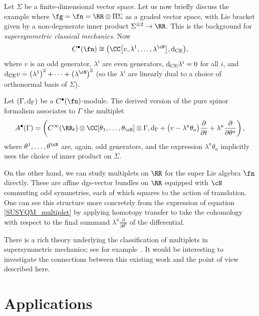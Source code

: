 \documentclass[10pt,a4paper]{amsart}
\numberwithin{equation}{section}
\def\d{{\rm d}}
\begin{document}
\begin{eg}
	Let $\Sigma$ be a finite-dimensional vector space. Let us now briefly discuss the example where $\fg = \fn = \RR \oplus \Pi \Sigma$ as a graded vector space, with Lie bracket given by a non-degenerate inner product $\Sigma^{\otimes 2} \to \RR$. This is the background for \emph{supersymmetric classical mechanics}. Now
	\begin{equation*}
	C^\bullet(\fn) \cong \big(\CC\big[v, \lambda^1, \ldots, \lambda^\cN\big] , \d_{\mathrm{CE}}\big),
	\end{equation*}
	where $v$ is an odd generator, $\lambda^i$ are even generators, $\d_{\mathrm{CE}} \lambda^i = 0$ for all $i$, and $\d_{\mathrm{CE}} v = \big(\lambda^1\big)^2 + \cdots + \big(\lambda^\cN\big)^2$ (so the $\lambda^i$ are linearly dual to a choice of orthonormal basis of $\Sigma$).
	
	Let $(\Gamma, \d_\Gamma)$ be a $C^\bullet(\fn)$-module. The derived version of the pure spinor formalism associates to $\Gamma$ the multiplet
	\begin{equation} \label{SUSYQM_multiplet}
	A^\bullet(\Gamma) = \left(C^\infty(\RR_t) \otimes \CC[\theta_1, \ldots, \theta_\cN] \otimes \Gamma , \d_\Gamma + \big(v - \lambda^a\theta_a\big)\frac{\partial}{\partial t} + \lambda^a \frac{\partial}{\partial \theta^a}\right),
	\end{equation}
	where $\theta^1, \ldots, \theta^\cN$ are, again, odd generators, and the expression $\lambda^a \theta_a$ implicitly uses the choice of inner product on $\Sigma$.
	
	On the other hand, we can study multiplets on $\RR$ for the super Lie algebra $\fn$ directly. These are affine dgs-vector bundles on $\RR$ equipped with $\cN$ commuting odd symmetries, each of which squares to the action of translation. One can see this structure more concretely from the expression of equation \eqref{SUSYQM_multiplet} by applying homotopy transfer to take the cohomology with respect to the final summand $\lambda^a \frac{\partial}{\partial \theta^a}$ of the differential.
	
	There is a rich theory underlying the classification of multiplets in supersymmetric mechanics; see for example~\cite{FauxGates}. It would be interesting to investigate the connections between this existing work and the point of view described here.
\end{eg}

\section{Applications}
\label{sec: examples}
\end{document}
